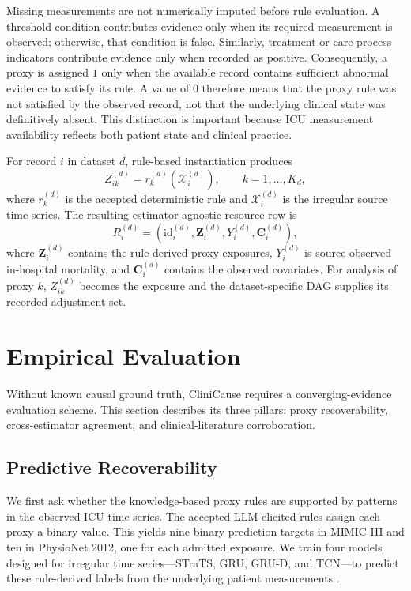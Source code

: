 \documentclass[letterpaper]{article}
\begin{document}
Missing measurements are not numerically imputed before rule evaluation. A
threshold condition contributes evidence only when its required measurement is
observed; otherwise, that condition is false. Similarly, treatment or
care-process indicators contribute evidence only when recorded as positive.
Consequently, a proxy is assigned \(1\) only when the available record contains
sufficient abnormal evidence to satisfy its rule. A value of \(0\) therefore
means that the proxy rule was not satisfied by the observed record, not that the
underlying clinical state was definitively absent. This distinction is
important because ICU measurement availability reflects both patient state and
clinical practice.

For record \(i\) in dataset \(d\), rule-based instantiation produces
\[
Z_{ik}^{(d)}
=
r_k^{(d)}\!\left(\mathcal{X}_i^{(d)}\right),
\qquad
k=1,\ldots,K_d,
\]
where \(r_k^{(d)}\) is the accepted deterministic rule and
\(\mathcal{X}_i^{(d)}\) is the irregular source time series. The resulting
estimator-agnostic resource row is
\[
R_i^{(d)}
=
\left(
\mathrm{id}_i^{(d)},
\mathbf Z_i^{(d)},
Y_i^{(d)},
\mathbf C_i^{(d)}
\right),
\]
where \(\mathbf Z_i^{(d)}\) contains the rule-derived proxy exposures,
\(Y_i^{(d)}\) is source-observed in-hospital mortality, and
\(\mathbf C_i^{(d)}\) contains the observed covariates. For analysis of proxy
\(k\), \(Z_{ik}^{(d)}\) becomes the exposure and the dataset-specific DAG
supplies its recorded adjustment set. 

\section{Empirical Evaluation}\label{sec:eval}
Without known causal ground truth, CliniCause requires a converging-evidence
evaluation scheme. This section describes its three pillars:  proxy recoverability, cross-estimator agreement, and
clinical-literature corroboration.

\subsection{Predictive Recoverability}

We first ask whether the knowledge-based proxy rules are supported by patterns in
the observed ICU time series. The accepted LLM-elicited rules assign each
proxy a binary value. This yields nine binary prediction targets in MIMIC-III
and ten in PhysioNet 2012, one for each admitted exposure. We train four models designed for irregular time series---STraTS, GRU, GRU-D,
and TCN---to predict these rule-derived labels from the underlying patient
measurements
\cite{tipirneni2022strats,cho2014gru,che2018grud,bai2018tcn}.
\end{document}
